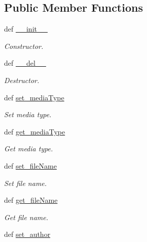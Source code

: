 \subsection*{Public Member Functions}
\begin{DoxyCompactItemize}
\item 
def \hyperlink{classlmf_1_1src_1_1resources_1_1audio_1_1_audio_ad160d4e583ac17c4825a0432d6715685}{\+\_\+\+\_\+init\+\_\+\+\_\+}
\begin{DoxyCompactList}\small\item\em Constructor. \end{DoxyCompactList}\item 
def \hyperlink{classlmf_1_1src_1_1resources_1_1audio_1_1_audio_af6706b4ce77d04e2c5d450b83d9586ae}{\+\_\+\+\_\+del\+\_\+\+\_\+}
\begin{DoxyCompactList}\small\item\em Destructor. \end{DoxyCompactList}\item 
def \hyperlink{classlmf_1_1src_1_1resources_1_1audio_1_1_audio_a06ad307cf28b320dc7b3f68bef095a2a}{set\+\_\+media\+Type}
\begin{DoxyCompactList}\small\item\em Set media type. \end{DoxyCompactList}\item 
def \hyperlink{classlmf_1_1src_1_1resources_1_1audio_1_1_audio_ad438b769d1128fad798257ef7178e157}{get\+\_\+media\+Type}
\begin{DoxyCompactList}\small\item\em Get media type. \end{DoxyCompactList}\item 
def \hyperlink{classlmf_1_1src_1_1resources_1_1audio_1_1_audio_a343a6b91b9f56c6cb88bba6238308e68}{set\+\_\+file\+Name}
\begin{DoxyCompactList}\small\item\em Set file name. \end{DoxyCompactList}\item 
def \hyperlink{classlmf_1_1src_1_1resources_1_1audio_1_1_audio_a30677ee2f81e15e7d9c613cd24019c27}{get\+\_\+file\+Name}
\begin{DoxyCompactList}\small\item\em Get file name. \end{DoxyCompactList}\item 
def \hyperlink{classlmf_1_1src_1_1resources_1_1audio_1_1_audio_a60e47f320593a0f02d9accb7a1af1434}{set\+\_\+author}

\end{DoxyCompactItemize}

